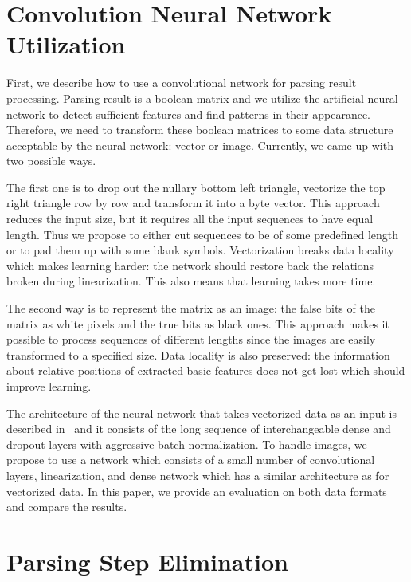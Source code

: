 \section{Convolution Neural Network Utilization}

First, we describe how to use a convolutional network for parsing result processing. Parsing result is a boolean matrix and we utilize the artificial neural network to detect sufficient features and find patterns in their appearance.
Therefore, we need to transform these boolean matrices to some data structure acceptable by the neural network: vector or image.
Currently, we came up with two possible ways.

The first one is to drop out the nullary bottom left triangle, vectorize the top right triangle row by row and transform it into a byte vector.
This approach reduces the input size, but it requires all the input sequences to have equal length.
Thus we propose to either cut sequences to be of some predefined length or to pad them up with some blank symbols.
Vectorization breaks data locality which makes learning harder: the network should restore back the relations broken during linearization.
This also means that learning takes more time.

The second way is to represent the matrix as an image: the false bits of the matrix as white pixels and the true bits as black ones.
This approach makes it possible to process sequences of different lengths since the images are easily transformed to a specified size.
Data locality is also preserved: the information about relative positions of extracted basic features does not get lost which should improve learning.

The architecture of the neural network that takes vectorized data as an input is described in~\cite{grigorevcomposition} and it consists of the long sequence of interchangeable dense and dropout layers with aggressive batch normalization. To handle images, we propose to use a network which consists of a small number of convolutional layers, linearization, and dense network which has a similar architecture as for vectorized data.
In this paper, we provide an evaluation on both data formats and compare the results.

\section{Parsing Step Elimination}

